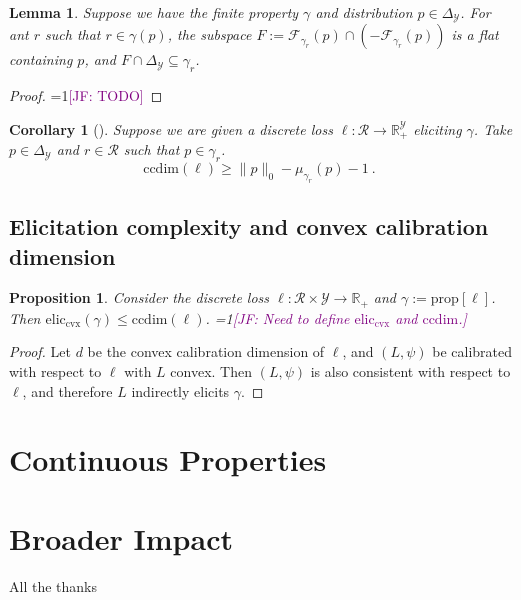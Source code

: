 \documentclass{article}
\newcommand{\Comments}{1}
\newcommand{\mynote}[2]{\ifnum\Comments=1\textcolor{#1}{#2}\fi}
\newcommand{\jessie}[1]{\mynote{purple}{[JF: #1]}}
\newcommand{\reals}{\mathbb{R}}
\newcommand{\simplex}{\Delta_\Y}
\newcommand{\prop}[1]{\mathrm{prop}[#1]}
\newcommand{\eliccvx}{\mathrm{elic}_\mathrm{cvx}}
\newcommand{\ccdim}{\mathrm{ccdim}}
\newcommand{\F}{\mathcal{F}}
\newcommand{\R}{\mathcal{R}}
\newcommand{\Y}{\mathcal{Y}}
\newtheorem{lemma}{Lemma}
\newtheorem{proposition}{Proposition}
\newtheorem{corollary}{Corollary}
\begin{document}
\begin{lemma}\label{lem:feas-sub-is-a-flat}
	Suppose we have the finite property $\gamma$ and distribution $p \in \simplex$.
	For ant $r$ such that $r \in \gamma(p)$, the subspace $F := \F_{\gamma_r}(p) \cap (-\F_{\gamma_r}(p))$ is a flat containing $p$, and $F \cap \simplex \subseteq \gamma_r$.
\end{lemma}
\begin{proof}
	\jessie{TODO}
\end{proof}

\begin{corollary}[\cite{ramaswamy2016convex}]
	Suppose we are given a discrete loss $\ell:\R \to \reals^\Y_+$ eliciting $\gamma$.
	Take $p \in \simplex$ and $r \in \R$ such that $p \in \gamma_r$.
	\begin{equation}
	\ccdim(\ell) \geq \|p\|_0 - \mu_{\gamma_r}(p) - 1~.~
	\end{equation}
\end{corollary}

\subsection{Elicitation complexity and convex calibration dimension}

\begin{proposition}
	Consider the discrete loss $\ell : \R \times \Y \to \reals_+$ and $\gamma:= \prop{\ell}$.
	Then $\eliccvx(\gamma) \leq \ccdim(\ell)$.
	\jessie{Need to define $\eliccvx$ and $\ccdim$.}
\end{proposition}
\begin{proof}
	Let $d$ be the convex calibration dimension of $\ell$, and $(L, \psi)$ be calibrated with respect to $\ell$ with $L$ convex.
	Then $(L, \psi)$ is also consistent with respect to $\ell$, and therefore $L$ indirectly elicits $\gamma$.
\end{proof}



\section{Continuous Properties}\label{sec:contin-consis}



\newpage

\section*{Broader Impact}

\begin{ack}
All the thanks
\end{ack}



\end{document}
